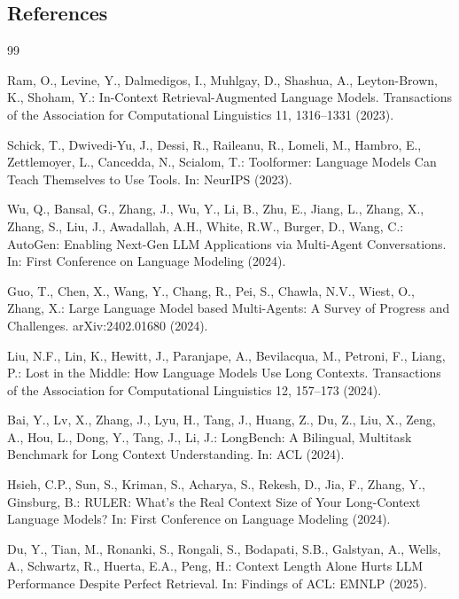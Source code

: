 \documentclass[
  runningheads]{llncs}
\begin{document}
\subsection{References}\label{references}

\begin{thebibliography}{99}

Ram, O., Levine, Y., Dalmedigos, I., Muhlgay, D., Shashua, A., Leyton-Brown, K., Shoham, Y.: In-Context Retrieval-Augmented Language Models. Transactions of the Association for Computational Linguistics 11, 1316--1331 (2023).

Schick, T., Dwivedi-Yu, J., Dessi, R., Raileanu, R., Lomeli, M., Hambro, E., Zettlemoyer, L., Cancedda, N., Scialom, T.: Toolformer: Language Models Can Teach Themselves to Use Tools. In: NeurIPS (2023).

Wu, Q., Bansal, G., Zhang, J., Wu, Y., Li, B., Zhu, E., Jiang, L., Zhang, X., Zhang, S., Liu, J., Awadallah, A.H., White, R.W., Burger, D., Wang, C.: AutoGen: Enabling Next-Gen LLM Applications via Multi-Agent Conversations. In: First Conference on Language Modeling (2024).

Guo, T., Chen, X., Wang, Y., Chang, R., Pei, S., Chawla, N.V., Wiest, O., Zhang, X.: Large Language Model based Multi-Agents: A Survey of Progress and Challenges. arXiv:2402.01680 (2024).

Liu, N.F., Lin, K., Hewitt, J., Paranjape, A., Bevilacqua, M., Petroni, F., Liang, P.: Lost in the Middle: How Language Models Use Long Contexts. Transactions of the Association for Computational Linguistics 12, 157--173 (2024).

Bai, Y., Lv, X., Zhang, J., Lyu, H., Tang, J., Huang, Z., Du, Z., Liu, X., Zeng, A., Hou, L., Dong, Y., Tang, J., Li, J.: LongBench: A Bilingual, Multitask Benchmark for Long Context Understanding. In: ACL (2024).

Hsieh, C.P., Sun, S., Kriman, S., Acharya, S., Rekesh, D., Jia, F., Zhang, Y., Ginsburg, B.: RULER: What's the Real Context Size of Your Long-Context Language Models? In: First Conference on Language Modeling (2024).

Du, Y., Tian, M., Ronanki, S., Rongali, S., Bodapati, S.B., Galstyan, A., Wells, A., Schwartz, R., Huerta, E.A., Peng, H.: Context Length Alone Hurts LLM Performance Despite Perfect Retrieval. In: Findings of ACL: EMNLP (2025).


\end{thebibliography}
\end{document}
